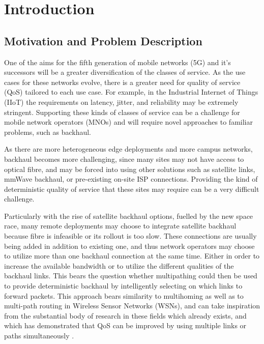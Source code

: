 
\cleardoublepage
\chapter{Introduction}

\label{cha:introduction}

\section{Motivation and Problem Description}
\label{sec:motivation}

One of the aims for the fifth generation of mobile networks (5G) and it's successors will be a greater diversification of the classes of service. As the use cases for these networks evolve, there is a greater need for quality of service (QoS) tailored to each use case. For example, in the Industrial Internet of Things (IIoT) the requirements on latency, jitter, and reliability may be extremely stringent. Supporting these kinds of classes of service can be a challenge for mobile network operators (MNOs) and will require novel approaches to familiar problems, such as backhaul.

As there are more heterogeneous edge deployments and more campus networks, backhaul becomes more challenging, since many sites may not have access to optical fibre, and may be forced into using other solutions such as satellite links, mmWave backhaul, or pre-existing on-site ISP connections. Providing the kind of deterministic quality of service that these sites may require can be a very difficult challenge.

Particularly with the rise of satellite backhaul options, fuelled by the new space race, many remote deployments may choose to integrate satellite backhaul because fibre is infeasible or its rollout is too slow. These connections are usually being added in addition to existing one, and thus network operators may choose to utilize more than one backhaul connection at the same time. Either in order to increase the available bandwidth or to utilize the different qualities of the backhaul links. This bears the question whether multipathing could then be used to provide deterministic backhaul by intelligently selecting on which links to forward packets. This approach bears similarity to multihoming as well as to multi-path routing in Wireless Sensor Networks (WSNs), and can take inspiration from the substantial body of research in these fields which already exists, and which has demonstrated that QoS can be improved by using multiple links or paths simultaneously \cite{akella2003measurement, tao2005improving, habib2007improving, goldenberg2004optimizing, huang2008multiconstrained, akella2008performance}.


